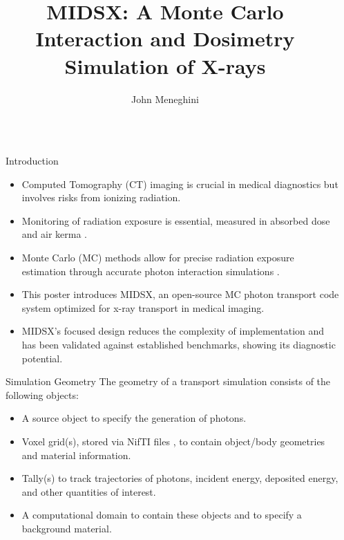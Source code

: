 \documentclass[final]{beamer}
\title{MIDSX: A Monte Carlo Interaction and Dosimetry Simulation of X-rays}
\author{John Meneghini}
\institute[shortinst]{Department of Physics, Saint Vincent College, Latrobe, PA 15650}
\newlength{\sepwidth}
\newlength{\colwidth}
\newcommand{\separatorcolumn}{\begin{column}{\sepwidth}\end{column}}
\begin{document}
\begin{frame}[t]
\begin{columns}[t]
\separatorcolumn

\begin{column}{\colwidth}

  \begin{block}{Introduction}
    \begin{itemize}
      \item Computed Tomography (CT) imaging is crucial in medical diagnostics but involves risks from ionizing radiation.
      \item Monitoring of radiation exposure is essential, measured in absorbed dose and air kerma \cite{lauer2009elements}.
      \item Monte Carlo (MC) methods allow for precise radiation exposure estimation through accurate photon interaction simulations \cite{essmedphys2012}.
      \item This poster introduces MIDSX, an open-source MC photon transport code system optimized for x-ray transport in medical imaging.
      \item MIDSX's focused design reduces the complexity of implementation and has been validated against established
      benchmarks, showing its diagnostic potential.
    \end{itemize}
    \vspace{-\baselineskip}
  \end{block}

  \begin{block}{Simulation Geometry}
    The geometry of a transport simulation consists of the following objects:
    \begin{itemize}
      \item A source object to specify the generation of photons.
      \item Voxel grid(s), stored via NifTI files \cite{nifti2004}, to contain object/body geometries and material information.
      \item Tally(s) to track trajectories of photons, incident energy, deposited energy, and other quantities of interest.
      \item A computational domain to contain these objects and to specify a background material.
    \end{itemize}


\end{block}
\end{column}
\end{columns}
\end{frame}
\end{document}
